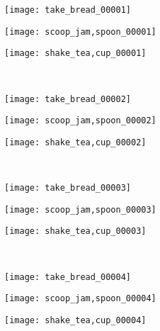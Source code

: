 \documentclass{bmvc2k}
\begin{document}
\begin{figure}[h]
	\centering      
	\begin{subfigure}[b]{0.32\textwidth}
		\texttt{[image: take\_bread\_00001]}
	\end{subfigure}
	\begin{subfigure}[b]{0.32\textwidth}
		\texttt{[image: scoop\_jam,spoon\_00001]}
	\end{subfigure}
	\begin{subfigure}[b]{0.32\textwidth}
		\texttt{[image: shake\_tea,cup\_00001]}
	\end{subfigure}\\
	\vskip 2mm
	\begin{subfigure}[b]{0.32\textwidth}
		\texttt{[image: take\_bread\_00002]}
	\end{subfigure}
	\begin{subfigure}[b]{0.32\textwidth}
		\texttt{[image: scoop\_jam,spoon\_00002]}
	\end{subfigure}
	\begin{subfigure}[b]{0.32\textwidth}
		\texttt{[image: shake\_tea,cup\_00002]}
	\end{subfigure}\\
	\vskip 2mm
	\begin{subfigure}[b]{0.32\textwidth}
		\texttt{[image: take\_bread\_00003]}
	\end{subfigure}
	\begin{subfigure}[b]{0.32\textwidth}
		\texttt{[image: scoop\_jam,spoon\_00003]}
	\end{subfigure}
	\begin{subfigure}[b]{0.32\textwidth}
		\texttt{[image: shake\_tea,cup\_00003]}
	\end{subfigure}\\
	\vskip 2mm
	\begin{subfigure}[b]{0.32\textwidth}
		\texttt{[image: take\_bread\_00004]}
	\end{subfigure}
	\begin{subfigure}[b]{0.32\textwidth}
		\texttt{[image: scoop\_jam,spoon\_00004]}
	\end{subfigure}
	\begin{subfigure}[b]{0.32\textwidth}
		\texttt{[image: shake\_tea,cup\_00004]}
	\end{subfigure}\\
	\vskip 2mm
	\begin{subfigure}[b]{0.32\textwidth}

\end{subfigure}
\end{figure}
\end{document}
